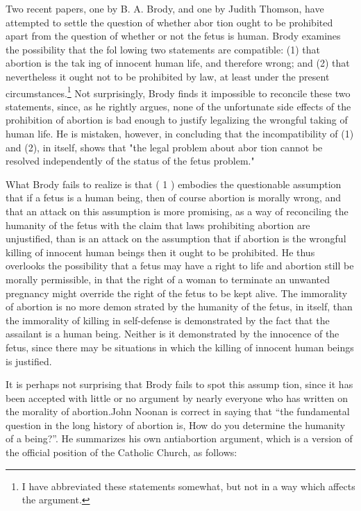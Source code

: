 Two recent papers, one by B. A. Brody,\autocite{Brody1} and one by Judith
Thomson,\autocite{Thomson1} have attempted to settle the question of whether abor
tion ought to be prohibited apart from the question of whether or
not the fetus is human. Brody examines the possibility that the fol
lowing two statements are compatible: (1) that abortion is the tak
ing of innocent human life, and therefore wrong; and (2) that
nevertheless it ought not to be prohibited by law, at least under the
present circumstances.\footnote{ I have abbreviated these statements somewhat, but not in a way
which affects the argument.} Not surprisingly, Brody finds it impossible
to reconcile these two statements, since, as he rightly argues, none of
the unfortunate side effects of the prohibition of abortion is bad
enough to justify legalizing the wrongful taking of human life. He
is mistaken, however, in concluding that the incompatibility of
(1) and (2), in itself, shows that "the legal problem about abor
tion cannot be resolved independently of the status of the fetus
problem."\autocite[p. 369]{Brody1}

What Brody fails to realize is that ( 1 ) embodies the questionable
assumption that if a fetus is a human being, then of course abortion
is morally wrong, and that an attack on this assumption is more
promising, as a way of reconciling the humanity of the fetus with
the claim that laws prohibiting abortion are unjustified, than is an
attack on the assumption that if abortion is the wrongful killing of
innocent human beings then it ought to be prohibited. He thus
overlooks the possibility that a fetus may have a right to life and
abortion still be morally permissible, in that the right of a woman
to terminate an unwanted pregnancy might override the right of the
fetus to be kept alive. The immorality of abortion is no more demon
strated by the humanity of the fetus, in itself, than the immorality
of killing in self-defense is demonstrated by the fact that the assailant is a human being. Neither is it demonstrated by the innocence
of the fetus, since there may be situations in which the killing of
innocent human beings is justified.

It is perhaps not surprising that Brody fails to spot this assump
tion, since it has been accepted with little or no argument by nearly
everyone who has written on the morality of abortion.John Noonan is correct in saying that ``the fundamental
question in the long history of abortion is, How do you
determine the humanity of a being?”. \autocite[p. 125]{Noonan1} He summarizes his
own antiabortion argument, which is a version of the
official position of the Catholic Church, as follows:\autocite[p. 134]{Noonan2}

